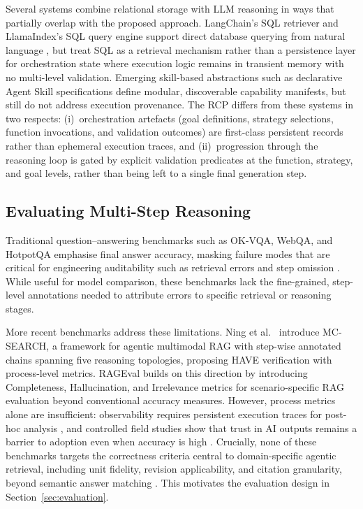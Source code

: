 \documentclass[largeformat]{interact}
\begin{document}
Several systems combine relational storage with LLM reasoning in ways that partially overlap with the proposed approach. LangChain's SQL retriever and LlamaIndex's SQL query engine support direct database querying from natural language \cite{aster2024langchainsql}, but treat SQL as a retrieval mechanism rather than a persistence layer for orchestration state where execution logic remains in transient memory with no multi-level validation. Emerging skill-based abstractions such as declarative Agent Skill specifications \cite{agentskills2024} define modular, discoverable capability manifests, but still do not address execution provenance. The RCP differs from these systems in two respects: (i)~orchestration artefacts (goal definitions, strategy selections, function invocations, and validation outcomes) are first-class persistent records rather than ephemeral execution traces, and (ii)~progression through the reasoning loop is gated by explicit validation predicates at the function, strategy, and goal levels, rather than being left to a single final generation step.

\subsection{Evaluating Multi-Step Reasoning}
\label{sec:evaluating_multistep_reasoning}
Traditional question--answering benchmarks such as OK-VQA, WebQA, and HotpotQA emphasise final answer accuracy, masking failure modes that are critical for engineering auditability such as retrieval errors and step omission \cite{marino2019okvqa, chang2021webqa, yang2018hotpotqa}. While useful for model comparison, these benchmarks lack the fine-grained, step-level annotations needed to attribute errors to specific retrieval or reasoning stages.

More recent benchmarks address these limitations. Ning et al.~\cite{ning2026mcsearch} introduce MC-SEARCH, a framework for agentic multimodal RAG with step-wise annotated chains spanning five reasoning topologies, proposing HAVE verification with process-level metrics. RAGEval \cite{zhu2025rageval} builds on this direction by introducing Completeness, Hallucination, and Irrelevance metrics for scenario-specific RAG evaluation beyond conventional accuracy measures. However, process metrics alone are insufficient: observability requires persistent execution traces for post-hoc analysis \cite{moshkovich2025agentic}, and controlled field studies show that trust in AI outputs remains a barrier to adoption even when accuracy is high \cite{lowhagen2025aiassistant}. Crucially, none of these benchmarks targets the correctness criteria central to domain-specific agentic retrieval, including unit fidelity, revision applicability, and citation granularity, beyond semantic answer matching \cite{jafari2025measurement}. This motivates the evaluation design in Section~\ref{sec:evaluation}.
\end{document}
